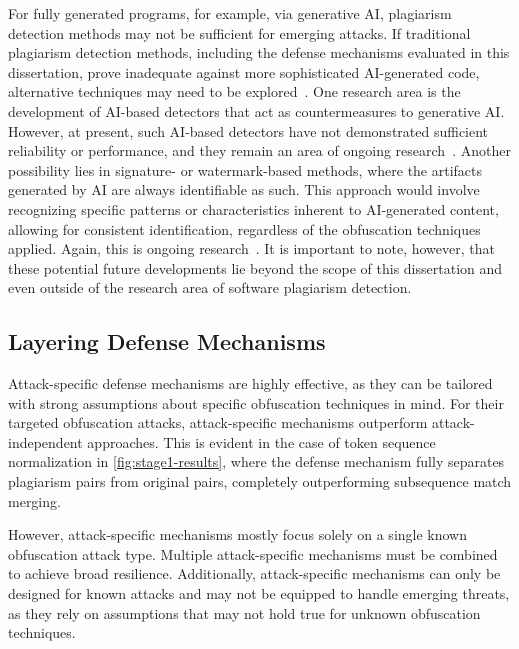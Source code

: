 For fully generated programs, for example, via generative AI, plagiarism detection methods may not be sufficient for emerging attacks.
If traditional plagiarism detection methods, including the defense mechanisms evaluated in this dissertation, prove inadequate against more sophisticated AI-generated code, alternative techniques may need to be explored~\cite{karnalim2024}. One research area is the development of AI-based detectors that act as countermeasures to generative AI. However, at present, such AI-based detectors have not demonstrated sufficient reliability or performance, and they remain an area of ongoing research~\cite{WeberWulff2023, Pan2024, Khalil_Er_2023}. Another possibility lies in signature- or watermark-based methods, where the artifacts generated by AI are always identifiable as such. This approach would involve recognizing specific patterns or characteristics inherent to AI-generated content, allowing for consistent identification, regardless of the obfuscation techniques applied. Again, this is ongoing research~\cite{zhao2024provable, Jiang2023}. 
%
It is important to note, however, that these potential future developments lie beyond the scope of this dissertation and even outside of the research area of software plagiarism detection.


\subsection{Layering Defense Mechanisms}
Attack-specific defense mechanisms are highly effective, as they can be tailored with strong assumptions about specific obfuscation techniques in mind.
For their targeted obfuscation attacks, attack-specific mechanisms outperform attack-independent approaches.
This is evident in the case of token sequence normalization in \autoref{fig:stage1-results}, where the defense mechanism fully separates plagiarism pairs from original pairs, completely outperforming subsequence match merging.

However, attack-specific mechanisms mostly focus solely on a single known obfuscation attack type. Multiple attack-specific mechanisms must be combined to achieve broad resilience.
Additionally, attack-specific mechanisms can only be designed for known attacks and may not be equipped to handle emerging threats, as they rely on assumptions that may not hold true for unknown obfuscation techniques.

